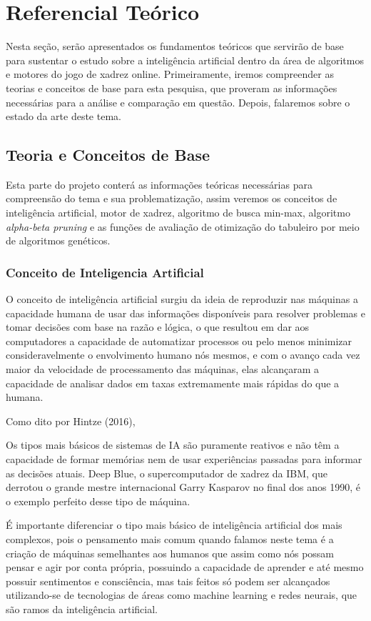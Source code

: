 \chapter{Referencial Teórico}
Nesta seção, serão apresentados os fundamentos teóricos que servirão de base para sustentar o estudo sobre a inteligência
artificial dentro da área de algoritmos e motores do jogo de xadrez online. Primeiramente, iremos compreender as teorias e
conceitos de base para esta pesquisa, que proveram as informações necessárias para a análise e comparação em questão.
Depois, falaremos sobre o estado da arte deste tema.

\section{Teoria e Conceitos de Base}
Esta parte do projeto conterá as informações teóricas necessárias para compreensão do tema e sua problematização,
assim veremos os conceitos de inteligência artificial, motor de xadrez, algoritmo de busca min-max,
algoritmo \textit{alpha-beta pruning} e as funções de avaliação de otimização do tabuleiro por meio de algoritmos genéticos.

\subsection{Conceito de Inteligencia Artificial}
O conceito de inteligência artificial surgiu da ideia de reproduzir nas máquinas a capacidade humana de usar das informações
disponíveis para resolver problemas e tomar decisões com base na razão e lógica, o que resultou em dar aos computadores a
capacidade de automatizar processos ou pelo menos minimizar consideravelmente o envolvimento humano nós mesmos,
e com o avanço cada vez maior da velocidade de processamento das máquinas, elas alcançaram a capacidade de analisar dados
em taxas extremamente mais rápidas do que a humana.

Como dito por Hintze (2016),
\begin{citacao}
    Os tipos mais básicos de sistemas de IA são puramente reativos e não têm a capacidade de formar memórias nem de usar
    experiências passadas para informar as decisões atuais. Deep Blue, o supercomputador de xadrez da IBM, que derrotou o
    grande mestre internacional Garry Kasparov no final dos anos 1990, é o exemplo perfeito desse tipo de máquina.
    \cite[tradução nossa.]{HINTZE}
\end{citacao}

É importante diferenciar o tipo mais básico de inteligência artificial dos mais complexos, pois o pensamento mais comum
quando falamos neste tema é a criação de máquinas semelhantes aos humanos que assim como nós possam pensar e agir por conta
própria, possuindo a capacidade de aprender e até mesmo possuir sentimentos e consciência, mas tais feitos só podem ser
alcançados utilizando-se de tecnologias de áreas como machine learning e redes neurais, que são ramos da inteligência
artificial.

